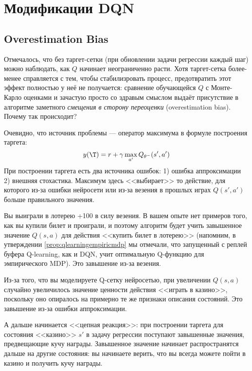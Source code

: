 \section{Модификации DQN}\label{sec:dqnmods}

\subsection{Overestimation Bias}\label{subsec:overestimation}

Отмечалось, что без таргет-сетки (при обновлении задачи регрессии каждый шаг) можно наблюдать, как $Q$ начинает неограниченно расти. Хотя таргет-сетка более-менее справляется с тем, чтобы стабилизровать процесс, предотвратить этот эффект полностью у неё не получается: сравнение обучающейся $Q$ с Монте-Карло оценками и зачастую просто со здравым смыслом выдаёт присутствие в алгоритме заметного \emph{смещения в сторону переоценки} (overestimation bias). Почему так происходит?

Очевидно, что источник проблемы --- оператор максимума в формуле построения таргета: 
$$y(\T ) = r + \gamma \max\limits_{a'} Q_{\theta^{-}}(s', a')$$
При построении таргета есть два источника ошибок: 1) ошибка аппроксимации 2) внешняя стохастика. Максимум здесь <<выбирает>> то действие, для которого из-за ошибки нейросети или из-за везения в прошлых играх $Q(s', a')$ больше правильного значения.

\begin{example}
Вы выиграли в лотерею +100 в силу везения. В вашем опыте нет примеров того, как вы купили билет и проиграли, и поэтому алгоритм будет учить завышенное значение $Q(s, a)$ для действия <<купить билет в лотерею>> (напомним, в утверждении \ref{prop:qlearningempiricmdp} мы отмечали, что запущенный с реплей буфера Q-learning, как и DQN, учит оптимальную Q-функцию для эмпирического MDP). Это завышение из-за везения.

Из-за того, что вы моделируете Q-сетку нейросетью, при увеличении $Q(s, a)$ случайно увеличилось значение ценности действия <<играть в казино>>, поскольку оно опиралось на примерно те же признаки описания состояний. Это завышение из-за ошибки аппроксимации.

А дальше начинается <<цепная реакция>>: при построении таргета для состояния <<казино>> $s'$ в задачу регрессии поступают завышенные значения, предвещающие кучу награды. Завышенное значение начинает распространятся дальше на другие состояния: вы начинаете верить, что вы всегда можете пойти в казино и получить кучу награды.
\end{example}

